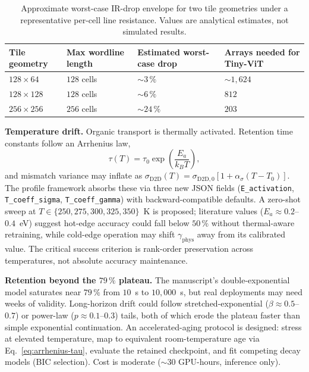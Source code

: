 \begin{table}[ht]
    \centering
    \caption{Approximate worst-case IR-drop envelope for two tile geometries under a representative per-cell line resistance.  Values are analytical estimates, not simulated results.}
    \label{tab:ir-drop-geometry}
    \small
    \setlength{\tabcolsep}{4pt}
    \begin{tabularx}{\textwidth}{@{}>{\raggedright\arraybackslash}X>{\raggedright\arraybackslash}X>{\raggedright\arraybackslash}X>{\raggedright\arraybackslash}X@{}}
        \toprule
        Tile geometry & Max wordline length & Estimated worst-case drop & Arrays needed for Tiny-ViT \\
        \midrule
        $128 \times 64$  & $128$ cells & $\sim$$3\,\%$  & $\sim$$1{,}624$ \\
        $128 \times 128$ & $128$ cells & $\sim$$6\,\%$  & $812$ \\
        $256 \times 256$ & $256$ cells & $\sim$$24\,\%$ & $203$ \\
        \bottomrule
    \end{tabularx}
\end{table}

\textbf{Temperature drift.}  Organic transport is thermally activated.  Retention time constants follow an Arrhenius law,
\begin{equation}
    \tau(T) = \tau_{0} \exp\!\left(\frac{E_{a}}{k_{B} T}\right),
    \label{eq:arrhenius-tau}
\end{equation}
and mismatch variance may inflate as $\sigma_{\text{D2D}}(T) = \sigma_{\text{D2D},0}[1 + \alpha_{\sigma}(T - T_{0})]$.  The profile framework absorbs these via three new JSON fields (\texttt{E\_activation}, \texttt{T\_coeff\_sigma}, \texttt{T\_coeff\_gamma}) with backward-compatible defaults.  A zero-shot sweep at $T \in \{250, 275, 300, 325, 350\}$~K is proposed; literature values ($E_{a} \approx 0.2$--$0.4$~eV) suggest hot-edge accuracy could fall below $50\,\%$ without thermal-aware retraining, while cold-edge operation may shift $\gamma_{\text{phys}}$ away from its calibrated value.  The critical success criterion is rank-order preservation across temperatures, not absolute accuracy maintenance.

\textbf{Retention beyond the $79\,\%$ plateau.}  The manuscript's double-exponential model saturates near $79\,\%$ from $10$~s to $10{,}000$~s, but real deployments may need weeks of validity.  Long-horizon drift could follow stretched-exponential ($\beta \approx 0.5$--$0.7$) or power-law ($p \approx 0.1$--$0.3$) tails, both of which erode the plateau faster than simple exponential continuation.  An accelerated-aging protocol is designed: stress at elevated temperature, map to equivalent room-temperature age via Eq.~\ref{eq:arrhenius-tau}, evaluate the retained checkpoint, and fit competing decay models (BIC selection).  Cost is moderate ($\sim$30 GPU-hours, inference only).

